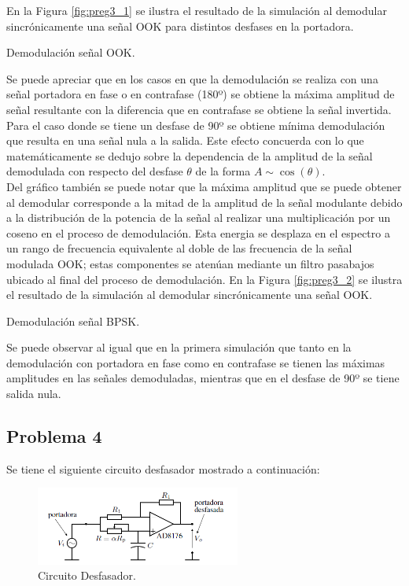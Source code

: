 \documentclass[letterpaper, titlepage]{article}
\begin{document}
		En la Figura \ref{fig:preg3_1} se ilustra el resultado de la simulación al demodular sincrónicamente una señal OOK para distintos desfases en la portadora.
	
			{Demodulación señal OOK.}
		
		Se puede apreciar que en los casos en que la demodulación se realiza con una señal portadora en fase o en contrafase (180º) se obtiene la máxima amplitud de señal resultante con la diferencia que en contrafase se obtiene la señal invertida. Para el caso donde se tiene un desfase de 90º se obtiene mínima demodulación que resulta en una señal nula a la salida. Este efecto concuerda con lo que matemáticamente se dedujo sobre la dependencia de la amplitud de la señal demodulada con respecto del desfase $\theta$ de la forma $A\sim\cos(\theta)$.\\
		
		Del gráfico también se puede notar que la máxima amplitud que se puede obtener al demodular corresponde a la mitad de la amplitud de la señal modulante debido a la distribución de la potencia de la señal al realizar una multiplicación por un coseno en el proceso de demodulación. Esta energia se desplaza en el espectro a un rango de frecuencia equivalente al doble de las frecuencia de la señal modulada OOK; estas componentes se atenúan mediante un filtro pasabajos ubicado al final del proceso de demodulación.
		\newpage
		En la Figura \ref{fig:preg3_2} se ilustra el resultado de la simulación al demodular sincrónicamente una señal OOK.
	
			{Demodulación señal BPSK.}
		
		Se puede observar al igual que en la primera simulación que tanto en la demodulación con portadora en fase como en contrafase se tienen las máximas amplitudes en las señales demoduladas, mientras que en el desfase de 90º se tiene salida nula.
		\newpage
	\subsection{Problema 4}
	
		Se tiene el siguiente circuito desfasador mostrado a continuación:
	
		\begin{figure}[H]
			\centering
				\includegraphics[width=0.6\textwidth]{circuitdesf}
			\caption{Circuito Desfasador.}
			\label{fig:ejemplo}
		\end{figure}
\end{document}
